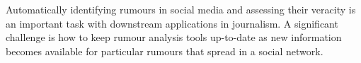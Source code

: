 Automatically identifying rumours in social media and assessing their veracity is an important task with downstream applications in journalism. A significant challenge is how to keep rumour analysis tools up-to-date as new information becomes available for particular rumours that spread in a social network.